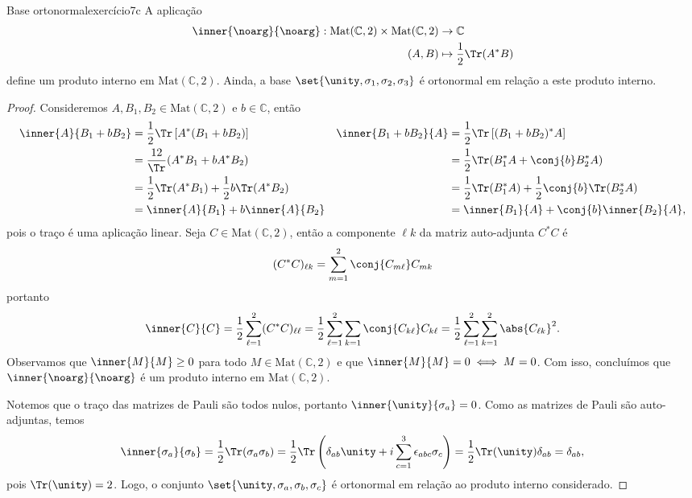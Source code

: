 \begin{proposition}{Base ortonormal}{exercício7c}
    A aplicação
    \begin{align*}
        \inner{\noarg}{\noarg} : \mathrm{Mat}(\mathbb{C}, 2) \times \mathrm{Mat}(\mathbb{C}, 2)
        &\to \mathbb{C}\\
        (A, B) &\mapsto \frac12\Tr(A^*B)
    \end{align*}
    define um produto interno em \(\mathrm{Mat}(\mathbb{C}, 2)\). Ainda, a base \(\set{\unity, \sigma_1, \sigma_2, \sigma_3}\) é ortonormal em relação a este produto interno.
\end{proposition}
\begin{proof}
    Consideremos \(A, B_1, B_2 \in \mathrm{Mat}(\mathbb{C}, 2)\) e \(b \in \mathbb{C}\), então
    \begin{align*}
        \inner{A}{B_1 + b B_2} &= \frac12 \Tr\left[A^*(B_1 + b B_2)\right]&
        \inner{B_1 + bB_2}{A} &= \frac12 \Tr\left[(B_1 + b B_2)^*A\right] \\
                              &= \frac{12}\Tr(A^* B_1 + b A^* B_2)&
                              &= \frac12\Tr(B_1^*A + \conj{b} B_2^*A)\\
                              &= \frac12 \Tr(A^*B_1) + \frac12b\Tr(A^*B_2)&
                              &= \frac12 \Tr(B_1^*A) + \frac12\conj{b}\Tr(B_2^*A) \\
                              &= \inner{A}{B_1} + b \inner{A}{B_2}&
                              &= \inner{B_1}{A} + \conj{b} \inner{B_2}{A},
    \end{align*}
    pois o traço é uma aplicação linear. Seja \(C \in \mathrm{Mat}(\mathbb{C}, 2)\), então a componente \(\ell k\) da matriz auto-adjunta \(C^*C\) é
    \begin{equation*}
        (C^*C)_{\ell k} = \sum_{m = 1}^2 \conj{C_{m\ell}}C_{mk}
    \end{equation*}
    portanto
    \begin{equation*}
        \inner{C}{C} = \frac12 \sum_{\ell = 1}^{2} (C^*C)_{\ell\ell} = \frac12 \sum_{\ell=1}^2 \sum_{k = 1} \conj{C_{k\ell}}C_{k\ell} = \frac12 \sum_{\ell = 1}^2 \sum_{k=1}^2 \abs{C_{\ell k}}^2.
    \end{equation*}
    Observamos que \(\inner{M}{M} \geq 0\) para todo \(M \in \mathrm{Mat}(\mathbb{C}, 2)\) e que \(\inner{M}{M} = 0 \iff M = 0\). Com isso, concluímos que \(\inner{\noarg}{\noarg}\) é um produto interno em \(\mathrm{Mat}(\mathbb{C}, 2)\).

    Notemos que o traço das matrizes de Pauli são todos nulos, portanto \(\inner{\unity}{\sigma_a} = 0\). Como as matrizes de Pauli são auto-adjuntas, temos
    \begin{equation*}
        \inner{\sigma_a}{\sigma_b} = \frac12 \Tr(\sigma_a \sigma_b) = \frac12 \Tr\left(\delta_{ab} \unity + i \sum_{c=1}^3 \epsilon_{abc} \sigma_c\right) = \frac12 \Tr(\unity) \delta_{ab} = \delta_{ab},
    \end{equation*}
    pois \(\Tr(\unity) = 2\). Logo, o conjunto \(\set{\unity, \sigma_a, \sigma_b, \sigma_c}\) é ortonormal em relação ao produto interno considerado.
\end{proof}

